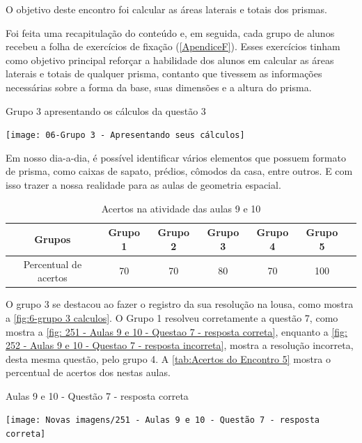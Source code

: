 O objetivo deste encontro foi calcular as áreas laterais e totais dos prismas.

Foi feita uma recapitulação do conteúdo e, em seguida, cada grupo de alunos recebeu a folha de exercícios de fixação (\autoref{ApendiceF}). Esses exercícios tinham como objetivo principal reforçar a habilidade dos alunos em calcular as áreas laterais e totais de qualquer prisma, contanto que tivessem as informações necessárias sobre a forma da base, suas dimensões e a altura do prisma.

\begin{CenteredFigure}
    \caption{Grupo 3 apresentando os cálculos da questão 3} \label{fig:6-grupo 3 calculos}
    \texttt{[image: 06-Grupo 3 - Apresentando seus cálculos]}
    \legend{\autoria}
\end{CenteredFigure}

Em nosso dia-a-dia, é possível identificar vários elementos que possuem formato de prisma, como caixas de sapato, prédios, cômodos da casa, entre outros. E com isso trazer a nossa realidade para as aulas de geometria espacial.

\begin{table}[htbp] \centering
    \caption{Acertos na atividade das aulas 9 e 10} \label{tab:Acertos do Encontro 5}
    \begin{tabular}{|c|c|c|c|c|c|c|}
        \hline
        \textbf{Grupos}       & \textbf{Grupo 1} & \textbf{Grupo 2} & \textbf{Grupo 3} & \textbf{Grupo 4} & \textbf{Grupo 5} \\
        \hline
        Percentual de acertos & 70               & 70               & 80               & 70               & 100              \\
        \hline
    \end{tabular}
    \legend{\legendaTabela}
\end{table}

O grupo 3 se destacou ao fazer o registro da sua resolução na lousa, como mostra a \autoref{fig:6-grupo 3 calculos}. O Grupo 1 resolveu corretamente a questão 7, como mostra a \autoref{fig: 251 - Aulas 9 e 10 - Questao 7 - resposta correta}, enquanto a \autoref{fig: 252 - Aulas 9 e 10 - Questao 7 - resposta incorreta}, mostra a resolução incorreta, desta mesma questão, pelo grupo 4. A \autoref{tab:Acertos do Encontro 5} mostra o percentual de acertos dos nestas aulas.

\begin{CenteredFigure}
    \caption{Aulas 9 e 10 - Questão 7 - resposta correta} \label{fig: 251 - Aulas 9 e 10 - Questao 7 - resposta correta}
    \texttt{[image: Novas imagens/251 - Aulas 9 e 10 - Questão 7 - resposta correta]}
    \legend{\autoria}
\end{CenteredFigure}

